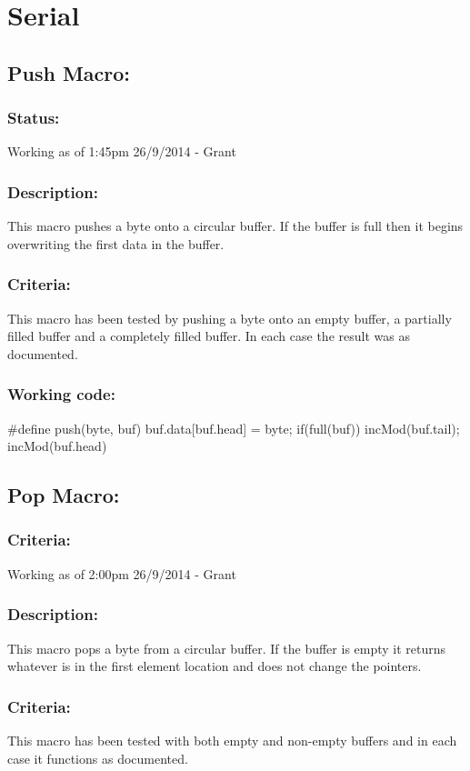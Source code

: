 \documentclass[]{article}
\begin{document}
\newpage
\section{Serial}
\subsection{Push Macro:}
\subsubsection{Status:}
Working as of 1:45pm 26/9/2014 - Grant

\subsubsection{Description:}
This macro pushes a byte onto a circular buffer. If the buffer is full then it begins overwriting the first data in the buffer.

\subsubsection{Criteria:}
This macro has been tested by pushing a byte onto an empty buffer, a partially filled buffer and a completely filled buffer. In each case the result was as documented.

\subsubsection{Working code:}
\#define push(byte, buf) buf.data[buf.head] = byte; if(full(buf)) incMod(buf.tail); incMod(buf.head)

\subsection{Pop Macro:}
\subsubsection{Criteria:}
Working as of 2:00pm 26/9/2014 - Grant

\subsubsection{Description:}
This macro pops a byte from a circular buffer. If the buffer is empty it returns whatever is in the first element location and does not change the pointers.

\subsubsection{Criteria:}
This macro has been tested with both empty and non-empty buffers and in each case it functions as documented.
\end{document}
